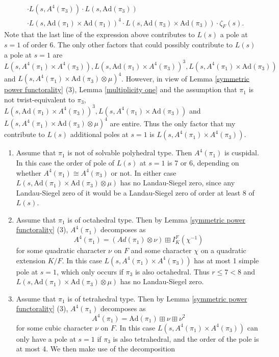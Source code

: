 \documentclass[12pt]{amsart}
\newcommand{\Ad}{\text{Ad}}
\begin{document}
\begin{enumerate}
\begin{enumerate}
\begin{align*}
            &\cdot L(s,A^4(\pi_3)) \cdot L(s,\Ad(\pi_3)) \\
            &\cdot L(s,\Ad(\pi_1) \times \Ad(\pi_1))^4 \cdot L(s,\Ad(\pi_3) \times \Ad(\pi_3)) \cdot \zeta_F(s).
        \end{align*}
        Note that the last line of the expression above contributes to $L(s)$ a pole at $s=1$ of order 6. The only other factors that could possibly contribute to $L(s)$ a pole at $s=1$ are $L(s,A^4(\pi_1) \times A^4(\pi_3)), L(s,\Ad(\pi_1) \times A^4(\pi_3))^3, L(s,A^4(\pi_1) \times \Ad(\pi_3))$ and $L(s,A^4(\pi_1) \times \Ad(\pi_3) \otimes \mu)^4$. However, in view of Lemma \ref{symmetric power functorality} (3), Lemma \ref{multiplicity one} and the assumption that $\pi_1$ is not twist-equivalent to $\pi_3$, $L(s,\Ad(\pi_1) \times A^4(\pi_3))^3, L(s,A^4(\pi_1) \times \Ad(\pi_3))$ and $L(s,A^4(\pi_1) \times \Ad(\pi_3) \otimes \mu)^4$ are entire. Thus the only factor that my contribute to $L(s)$ additional poles at $s=1$ is $L(s,A^4(\pi_1) \times A^4(\pi_3))$.
        \begin{enumerate}
            \item Assume that $\pi_1$ is not of solvable polyhedral type. Then $A^4(\pi_1)$ is cuspidal. In this case the order of pole of $L(s)$ at $s=1$ is 7 or 6, depending on whether $A^4(\pi_1) \cong A^4(\pi_3)$ or not. In either case $L(s,\Ad(\pi_1) \times \Ad(\pi_3) \otimes \mu)$ has no Landau-Siegel zero, since any Landau-Siegel zero of it would be a Landau-Siegel zero of order at least 8 of $L(s).$
            \item Assume that $\pi_1$ is of octahedral type. Then by Lemma \ref{symmetric power functorality} (3), $A^4(\pi_1)$ decomposes as 
            $$A^4(\pi_1) = (Ad(\pi_1) \otimes \nu) \boxplus I_K^F(\chi^{-1}) $$
            for some quadratic character $\nu$ on $F$ and some character $\chi$ on a quadratic extension $K/F$. In this case $L(s,A^4(\pi_1) \times A^4(\pi_3))$ has at most 1 simple pole at $s=1$, which only occurs if $\pi_3$ is also octahedral. Thus $r \leq 7 < 8$ and $L(s,\Ad(\pi_1) \times \Ad(\pi_3) \otimes \mu)$ has no Landau-Siegel zero.
            \item Assume that $\pi_1$ is of tetrahedral type. Then by Lemma \ref{symmetric power functorality} (3), $A^4(\pi_1)$ decomposes as 
            $$A^4(\pi_1) = \Ad(\pi_1) \boxplus \nu \boxplus \nu^2$$
            for some cubic character $\nu$ on $F$. In this case $L(s,A^4(\pi_1) \times A^4(\pi_3))$ can only have a pole at $s=1$ if $\pi_3$ is also tetrahedral, and the order of the pole is at most 4. We then make use of the decomposition 

\end{enumerate}
\end{enumerate}
\end{enumerate}
\end{document}
